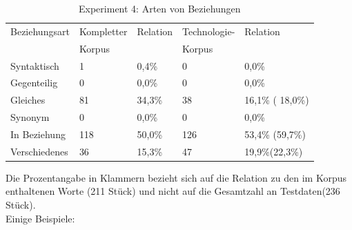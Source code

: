 \documentclass[12pt,a4paper]{report}
\begin{document}
\begin{table}[h]
\caption{Experiment 4: Arten von Beziehungen}
\begin{center}
\begin{tabular}{|l||l|l||l|l|}
\hline
Beziehungsart	& Kompletter	& Relation & Technologie-  & Relation\\
 				& Korpus 		& 		   & Korpus		& \\

\hline
 Syntaktisch & 1 &  0,4\%	& 0 & 0,0\% \\
 \hline
 Gegenteilig & 0 & 0,0\% 	& 0 & 0,0\% \\
 \hline
 Gleiches & 81 & 34,3\% 	& 38 & 16,1\% ( 18,0\%) \\
 \hline
 Synonym & 0 & 0,0\% 	& 0 & 0,0\% \\
 \hline
 In Beziehung & 118 & 50,0\% 	& 126 & 53,4\% (59,7\%)\\
 \hline
 Verschiedenes & 36 & 15,3\% 	& 47 & 19,9\%(22,3\%) \\
 \hline
 
\end{tabular}
\end{center}
\end{table}
		
		Die Prozentangabe in Klammern bezieht sich auf die Relation zu den im Korpus enthaltenen Worte (211 Stück) und nicht auf die Gesamtzahl an Testdaten(236 Stück).\\
		
Einige Beispiele:\\
\end{document}
